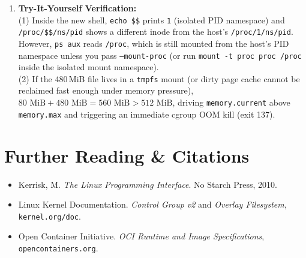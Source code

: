 \begin{enumerate}[leftmargin=18pt]
  \item \textbf{Try-It-Yourself Verification:}\\
  (1) Inside the new shell, \texttt{echo \$\$} prints \texttt{1} (isolated PID namespace) and \texttt{/proc/\$\$/ns/pid} shows a different inode from the host's \texttt{/proc/1/ns/pid}. However, \texttt{ps aux} reads \texttt{/proc}, which is still mounted from the host's PID namespace unless you pass \texttt{--mount-proc} (or run \texttt{mount -t proc proc /proc} inside the isolated mount namespace).\\
  (2) If the 480\,MiB file lives in a \texttt{tmpfs} mount (or dirty page cache cannot be reclaimed fast enough under memory pressure), $80\text{ MiB} + 480\text{ MiB} = 560\text{ MiB} > 512\text{ MiB}$, driving \texttt{memory.current} above \texttt{memory.max} and triggering an immediate cgroup OOM kill (exit 137).
\end{enumerate}

\section{Further Reading \protect\& Citations}
\begin{itemize}[leftmargin=15pt]
  \item Kerrisk, M. \emph{The Linux Programming Interface}. No Starch Press, 2010.
  \item Linux Kernel Documentation. \emph{Control Group v2} and \emph{Overlay Filesystem}, \texttt{kernel.org/doc}.
  \item Open Container Initiative. \emph{OCI Runtime and Image Specifications}, \texttt{opencontainers.org}.
\end{itemize}
